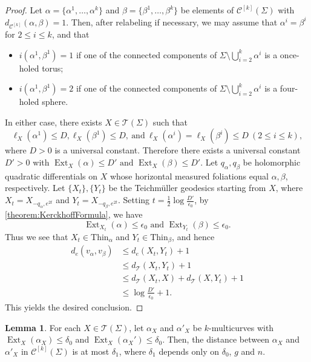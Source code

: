 \documentclass[a4paper,11pt]{amsart}
\numberwithin{equation}{section}
\theoremstyle{definition}
\newtheorem{lemma}[theorem]{Lemma}
\newcommand{\Teich}{\mathcal{T}}
\DeclareMathOperator{\Ext}{Ext}
\newcommand{\Thin}{\mathrm{Thin}}
\newcommand{\multicurve}[1]{\mathcal{C}^{[#1]}}
\begin{document}
\begin{proof}
    Let $\alpha = \{\alpha^1,\ldots,\alpha^k\}$ and
    $\beta = \{\beta^1,\ldots,\beta^k\}$ be elements of
    $\multicurve{k}(\Sigma)$ with
    $d_{\multicurve{k}}(\alpha,\beta) = 1$.
    Then, after relabeling if necessary, we may assume that
    $\alpha^i = \beta^i$ for $2 \le i \le k$, and that
    \begin{itemize}
        \item $i(\alpha^1,\beta^1) = 1$ if one of the connected components of
        $\Sigma \setminus \bigcup_{i=2}^k \alpha^i$ is a once-holed torus;
        \item $i(\alpha^1,\beta^1) = 2$ if one of the connected components of
        $\Sigma \setminus \bigcup_{i=2}^k \alpha^i$ is a four-holed sphere.
    \end{itemize}
    In either case, there exists $X\in \Teich(\Sigma)$ such that 
    \begin{equation*}
        \ell_X(\alpha^1)\leq D, \ell_X(\beta^1)\leq D,\ \text{and}\ \ell_X(\alpha^i)=\ell_X(\beta^i)\leq D\ (2\leq i\leq k),
    \end{equation*}
    where $D>0$ is a universal constant.
    Therefore there exists a universal constant $D'>0$ with $\Ext_X(\alpha)\leq D' \text{ and } \Ext_X(\beta)\leq D'$.
    Let $q_\alpha,q_\beta$ be holomorphic quadratic differentials on $X$ whose horizontal measured foliations equal $\alpha, \beta$, respectively.
    Let $\{X_t\}, \{Y_t\}$ be the Teichmüller geodesics starting from $X$, where $X_t=X_{-q_\alpha,e^{2t}} $ and $ Y_t = X_{-q_\beta,e^{2t}}$.
    Setting $t=\frac12\log\frac{D'}{\epsilon_0}$, by \cref{theorem:KerckhoffFormula}, we have 
    \begin{equation*}
        \Ext_{X_t}(\alpha)\leq \epsilon_0 \text{ and } \Ext_{Y_t}(\beta)\leq \epsilon_0.
    \end{equation*}
    Thus we see that $X_t\in \Thin_\alpha$ and $Y_t\in\Thin_\beta$, and hence
    \begin{align*}
        d_e(v_\alpha,v_\beta) &\leq d_e(X_t,Y_t)+1 \\
        &\leq d_{\Teich}(X_t,Y_t)+1 \\
        &\leq d_{\Teich}(X_t,X)+d_{\Teich}(X,Y_t)+1 \\
        &\leq \log\frac{D'}{\epsilon_0}+1.
    \end{align*}
    This yields the desired conclusion.
\end{proof}

\begin{lemma}\label{lemma:QuasiDenistiyOfQuasiInverse}
    For each $X\in\Teich(\Sigma)$, let $\alpha_X$ and $\alpha'_X$ be $k$-multicurves with $\Ext_X(\alpha_X)\leq \delta_0$ and $\Ext_X(\alpha_X')\leq \delta_0$.
    Then, the distance between $\alpha_X$ and $\alpha'_X$ in $\multicurve{k}(\Sigma)$ is at most $\delta_1$, where $\delta_1$ depends only on $\delta_0$, $g$ and $n$.
\end{lemma}
\end{document}
